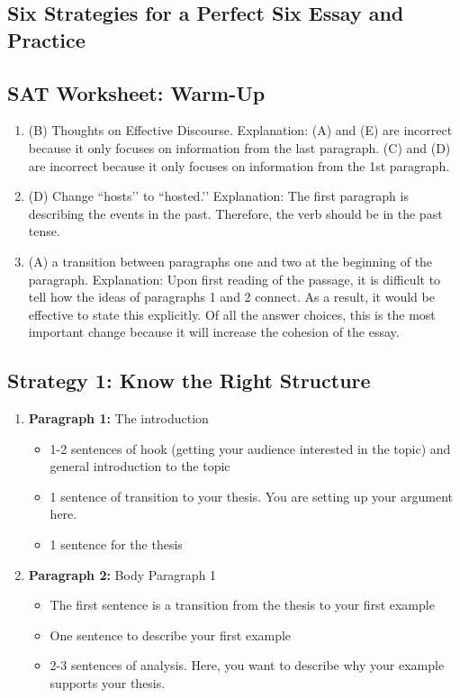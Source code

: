 \begin{enumerate}
\section{Six Strategies for a Perfect Six Essay and Practice}

\subsection{SAT Worksheet: Warm-Up}

\begin{enumerate}
\item (B) Thoughts on Effective Discourse. Explanation: (A) and (E) are incorrect because it only focuses on information from the last paragraph. (C) and (D) are incorrect because it only focuses on information from the 1st paragraph.
\item (D) Change ``hosts’’ to ``hosted.’’ Explanation: The first paragraph is describing the events in the past. Therefore, the verb should be in the past tense. 
\item (A) a transition between paragraphs one and two at the beginning of the paragraph. Explanation: Upon first reading of the passage, it is difficult to tell how the ideas of paragraphs 1 and 2 connect. As a result, it would be effective to state this explicitly. Of all the answer choices, this is the most important change because it will increase the cohesion of the essay.
\end{enumerate}

\subsection{Strategy 1: Know the Right Structure}

\begin{enumerate}
\item \textbf{Paragraph 1:} The introduction

\begin{itemize}
\item 1-2 sentences of hook (getting your audience interested in the topic) and general introduction to the topic
\item 1 sentence of transition to your thesis. You are setting up your argument here.
\item 1 sentence for the thesis
\end{itemize}

\item \textbf{Paragraph 2:} Body Paragraph 1
\begin{itemize}
\item The first sentence is a transition from the thesis to your first example
\item One sentence to describe your first example
\item 2-3 sentences of analysis. Here, you want to describe why your example supports your thesis. 
\end{itemize}


\end{enumerate}
\end{enumerate}
